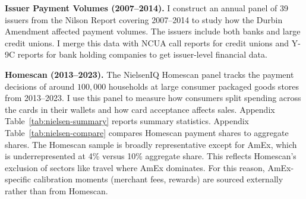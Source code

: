 \documentclass[main.tex]{subfiles}
\begin{document}
\vspace{0.05in}

\noindent \textbf{Issuer Payment Volumes (2007--2014).} I construct an annual panel of 39 issuers from the Nilson Report covering 2007--2014 to study how the Durbin Amendment affected payment volumes.
The issuers include both banks and large credit unions.
I merge this data with NCUA call reports for credit unions and Y-9C reports for bank holding companies to get issuer-level financial data.

\vspace{0.05in}

\noindent \textbf{Homescan (2013--2023).} The NielsenIQ Homescan panel tracks the payment decisions of around $100,000$ households at large consumer packaged goods stores from 2013--2023.
I use this panel to measure how consumers split spending across the cards in their wallets and how card acceptance affects sales.
Appendix Table~\ref{tab:nielsen-summary} reports summary statistics.
Appendix Table~\ref{tab:nielsen-compare} compares Homescan payment shares to aggregate shares.
The Homescan sample is broadly representative except for AmEx, which is underrepresented at 4\% versus 10\% aggregate share. This reflects Homescan's exclusion of sectors like travel where AmEx dominates.
For this reason, AmEx-specific calibration moments (merchant fees, rewards) are sourced externally rather than from Homescan.

\vspace{0.05in}
\end{document}
